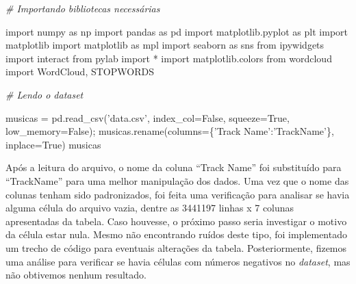 \documentclass[11pt]{article}
\newenvironment{Shaded}{}{}
\newcommand{\StringTok}[1]{\textcolor[rgb]{0.25,0.44,0.63}{{#1}}}
\newcommand{\CommentTok}[1]{\textcolor[rgb]{0.38,0.63,0.69}{\textit{{#1}}}}
\newcommand{\NormalTok}[1]{{#1}}
\newcommand{\ImportTok}[1]{{#1}}
\newcommand{\VariableTok}[1]{\textcolor[rgb]{0.10,0.09,0.49}{{#1}}}
\newcommand{\OperatorTok}[1]{\textcolor[rgb]{0.40,0.40,0.40}{{#1}}}
\begin{document}
    \begin{Shaded}
\begin{Highlighting}[]
    \CommentTok{# Importando bibliotecas necessárias}

\ImportTok{import}\NormalTok{ numpy }\ImportTok{as}\NormalTok{ np}
\ImportTok{import}\NormalTok{ pandas }\ImportTok{as}\NormalTok{ pd}
\ImportTok{import}\NormalTok{ matplotlib.pyplot }\ImportTok{as}\NormalTok{ plt}
\ImportTok{import}\NormalTok{ matplotlib }
\ImportTok{import}\NormalTok{ matplotlib }\ImportTok{as}\NormalTok{ mpl}
\ImportTok{import}\NormalTok{ seaborn }\ImportTok{as}\NormalTok{ sns}
\ImportTok{from}\NormalTok{ ipywidgets }\ImportTok{import}\NormalTok{ interact}
\ImportTok{from}\NormalTok{ pylab }\ImportTok{import} \OperatorTok{*}
\ImportTok{import}\NormalTok{ matplotlib.colors}
\ImportTok{from}\NormalTok{ wordcloud }\ImportTok{import}\NormalTok{ WordCloud, STOPWORDS}
\end{Highlighting}
\end{Shaded}

    \begin{Shaded}
\begin{Highlighting}[]
    \CommentTok{# Lendo o dataset}

\NormalTok{musicas }\OperatorTok{=}\NormalTok{ pd.read_csv(}\StringTok{'data.csv'}\NormalTok{, index_col}\OperatorTok{=}\VariableTok{False}\NormalTok{, squeeze}\OperatorTok{=}\VariableTok{True}\NormalTok{, low_memory}\OperatorTok{=}\VariableTok{False}\NormalTok{)}\OperatorTok{;}
\NormalTok{musicas.rename(columns}\OperatorTok{=}\NormalTok{\{}\StringTok{'Track Name'}\NormalTok{:}\StringTok{'TrackName'}\NormalTok{\}, inplace}\OperatorTok{=}\VariableTok{True}\NormalTok{)}
\NormalTok{musicas}
\end{Highlighting}
\end{Shaded}

    Após a leitura do arquivo, o nome da coluna ``Track Name'' foi
substituído para ``TrackName'' para uma melhor manipulação dos dados.
Uma vez que o nome das colunas tenham sido padronizados, foi feita uma
verificação para analisar se havia alguma célula do arquivo vazia,
dentre as 3441197 linhas x 7 colunas apresentadas da tabela. Caso
houvesse, o próximo passo seria investigar o motivo da célula estar
nula. Mesmo não encontrando ruídos deste tipo, foi implementado um
trecho de código para eventuais alterações da tabela. Posteriormente,
fizemos uma análise para verificar se havia células com números
negativos no \emph{dataset}, mas não obtivemos nenhum resultado.
\end{document}
